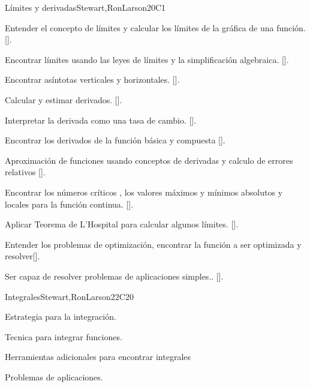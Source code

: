 \begin{syllabus}
\begin{unit}{Límites y derivadas}{}{Stewart,RonLarson}{20}{C1}
   \begin{learningoutcomes}
      \item Entender el concepto de límites y calcular los límites de la gráfica de una función. [\Assessment].
      \item Encontrar límites usando las leyes de límites y la simplificación algebraica. [\Assessment].
      \item Encontrar asíntotas verticales y horizontales. [\Assessment].
      \item Calcular y estimar derivados. [\Assessment].
      \item Interpretar la derivada como una tasa de cambio. [\Assessment].
      \item Encontrar los derivados de la función básica y compuesta [\Assessment].
      \item Aproximación de  funciones usando conceptos de  derivadas y calculo de  errores relativos [\Assessment].
      \item Encontrar los números críticos , los valores máximos y mínimos absolutos y locales para la función continua. [\Assessment].
      \item Aplicar Teorema de L'Hospital para calcular algunos límites. [\Assessment].
      \item Entender los problemas de optimización, encontrar la función a ser optimizada y resolver[\Assessment].
      \item Ser capaz de resolver problemas de aplicaciones simples.. [\Assessment].
        \end{learningoutcomes}
\end{unit}

\begin{unit}{Integrales}{}{Stewart,RonLarson}{22}{C20}
   \begin{topics}
    \item Estrategia para la integración.
    \item Tecnica para integrar funciones.
    \item Herramientas adicionales para encontrar integrales
    \item Problemas de aplicaciones.

   \end{topics}


\end{unit}
\end{syllabus}
